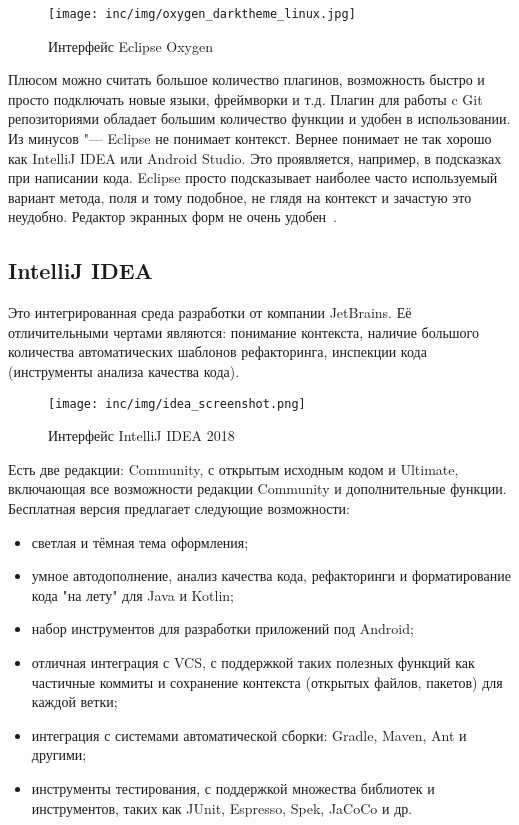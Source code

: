 \begin{figure}[ht]
  \centering
  \texttt{[image: inc/img/oxygen\_darktheme\_linux.jpg]}
  \caption{Интерфейс Eclipse Oxygen}
  \label{fig:eclipse}
\end{figure}

Плюсом можно считать большое количество плагинов, возможность быстро и просто подключать новые языки, фреймворки и т.д.
Плагин для работы c Git репозиториями обладает большим количество функции и удобен в использовании.
Из минусов "--- Eclipse не понимает контекст.
Вернее понимает не так хорошо как IntelliJ IDEA или Android Studio.
Это проявляется, например, в подсказках при написании кода.
Eclipse просто подсказывает наиболее часто используемый вариант метода, поля и тому подобное, не глядя на контекст и зачастую это неудобно.
Редактор экранных форм не очень удобен~\cite{eclipse:oxygen}.

\subsection{IntelliJ IDEA}
\label{subsec:idea}
Это интегрированная среда разработки от компании JetBrains.
Её отличительными чертами являются: понимание контекста, наличие большого количества автоматических шаблонов рефакторинга, инспекции кода (инструменты анализа качества кода).

\begin{figure}[ht]
  \centering
  \texttt{[image: inc/img/idea\_screenshot.png]}
  \caption{Интерфейс IntelliJ IDEA 2018}
  \label{fig:idea}
\end{figure}

Есть две редакции: Community, с открытым исходным кодом и Ultimate, включающая все возможности редакции Community и дополнительные функции.
Бесплатная версия предлагает следующие возможности:
\begin{itemize}
  \item светлая и тёмная тема оформления;
  \item умное автодополнение, анализ качества кода, рефакторинги и форматирование кода "на лету" для Java и Kotlin;
  \item набор инструментов для разработки приложений под Android;
  \item отличная интеграция с VCS, с поддержкой таких полезных функций как частичные коммиты и сохранение контекста (открытых файлов, пакетов) для каждой ветки;
  \item интеграция с системами автоматической сборки: Gradle, Maven, Ant и другими;
  \item инструменты тестирования, с поддержкой множества библиотек и инструментов, таких как JUnit, Espresso, Spek, JaCoCo и др.
\end{itemize}

